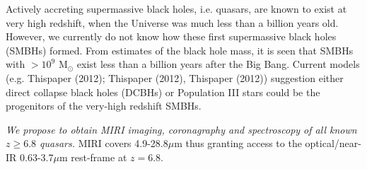 \documentclass[12pt]{article}
\newcommand{\mgii}{Mg\,{\sc ii}\ }
\begin{document}
%
%
\justification          %
Actively accreting supermassive black holes, i.e. quasars, are known to exist at very high redshift, when the Universe was
much less than a billion years old. 
However, we currently do not know how these first supermassive black holes (SMBHs) formed.
From estimates of the black hole mass, it is seen that SMBHs with $>10^{9}$ M$_{\odot}$ exist less than a billion years after the Big Bang.
Current models (e.g. Thispaper (2012); Thispaper (2012), Thispaper (2012)) suggestion either
direct collapse black holes (DCBHs) or Population {\sc III} stars could be the progenitors of the very-high redshift SMBHs. 

{\it We propose to obtain MIRI imaging, coronagraphy and spectroscopy of all known $z \geq 6.8$ quasars.} 
MIRI covers 4.9-28.8$\mu$m thus granting access to the optical/near-IR  0.63-3.7$\mu$m rest-frame at $z=6.8$.

\end{document}
